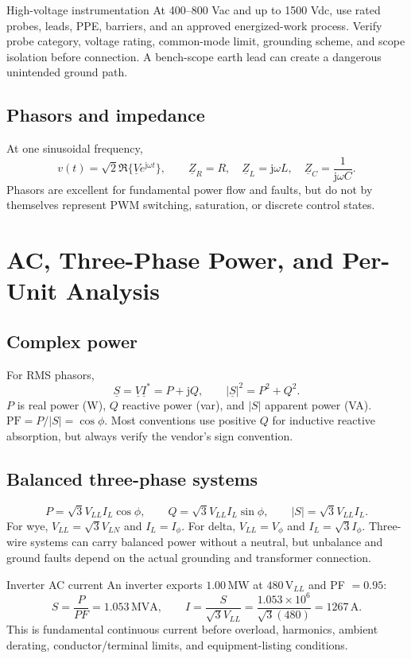 \documentclass[11pt]{article}
\newcommand{\V}{\mathrm{V}}
\newcommand{\A}{\mathrm{A}}
\newcommand{\MW}{\mathrm{MW}}
\newcommand{\MVA}{\mathrm{MVA}}
\newcommand{\jop}{\mathrm{j}}
\begin{document}
\begin{warningbox}{High-voltage instrumentation}
At 400--800 Vac and up to 1500 Vdc, use rated probes, leads, PPE, barriers,
and an approved energized-work process. Verify probe category, voltage rating,
common-mode limit, grounding scheme, and scope isolation before connection. A
bench-scope earth lead can create a dangerous unintended ground path.
\end{warningbox}

\subsection{Phasors and impedance}
At one sinusoidal frequency,
\[
v(t)=\sqrt2\Re\{\underline V e^{\jop\omega t}\},\qquad
\underline Z_R=R,\quad \underline Z_L=\jop\omega L,\quad
\underline Z_C=\frac{1}{\jop\omega C}.
\]
Phasors are excellent for fundamental power flow and faults, but do not by
themselves represent PWM switching, saturation, or discrete control states.

\section{AC, Three-Phase Power, and Per-Unit Analysis}

\subsection{Complex power}
For RMS phasors,
\[
\underline S=\underline V\underline I^*=P+\jop Q,\qquad |\underline S|^2=P^2+Q^2.
\]
$P$ is real power (W), $Q$ reactive power (var), and $|S|$ apparent power
(VA). $\mathrm{PF}=P/|S|=\cos\phi$. Most conventions use positive $Q$ for
inductive reactive absorption, but always verify the vendor's sign convention.

\subsection{Balanced three-phase systems}
\[
P=\sqrt3V_{LL}I_L\cos\phi,\qquad Q=\sqrt3V_{LL}I_L\sin\phi,\qquad
|S|=\sqrt3V_{LL}I_L.
\]
For wye, $V_{LL}=\sqrt3V_{LN}$ and $I_L=I_\phi$. For delta,
$V_{LL}=V_\phi$ and $I_L=\sqrt3I_\phi$. Three-wire systems can carry balanced
power without a neutral, but unbalance and ground faults depend on the actual
grounding and transformer connection.

\begin{examplebox}{Inverter AC current}
An inverter exports $1.00\,\MW$ at $480\,\V_{LL}$ and PF $=0.95$:
\[
S=\frac{P}{PF}=1.053\,\MVA,\qquad I=\frac{S}{\sqrt3V_{LL}}
=\frac{1.053\times10^6}{\sqrt3(480)}=1267\,\A.
\]
This is fundamental continuous current before overload, harmonics, ambient
derating, conductor/terminal limits, and equipment-listing conditions.
\end{examplebox}
\end{document}
